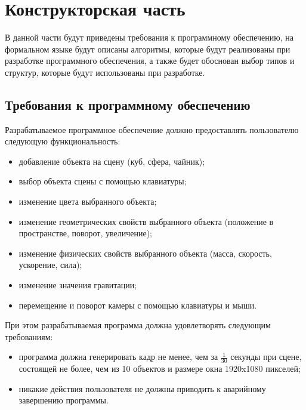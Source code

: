\section{Конструкторская часть}


В данной части будут приведены требования к программному обеспечению, на формальном языке будут описаны алгоритмы, которые будут реализованы при разработке программного обеспечения, а также будет обоснован выбор типов и структур, которые будут использованы при разработке. %

\subsection{Требования к программному обеспечению}


Разрабатываемое программное обеспечение должно предоставлять пользователю следующую функциональность:
\begin{itemize}
    \item добавление объекта на сцену (куб, сфера, чайник);
    \item выбор объекта сцены с помощью клавиатуры;
    \item изменение цвета выбранного объекта;
    \item изменение геометрических свойств выбранного объекта (положение в пространстве, поворот, увеличение);
    \item изменение физических свойств выбранного объекта (масса, скорость, ускорение, сила);
    \item изменение значения гравитации;
    \item перемещение и поворот камеры с помощью клавиатуры и мыши.
\end{itemize}

При этом разрабатываемая программа должна удовлетворять следующим требованиям:
\begin{itemize}
    \item программа должна генерировать кадр не менее, чем за $\frac{1}{30}$ секунды при сцене, состоящей не более, чем из 10 объектов и размере окна 1920x1080 пикселей;
    \item никакие действия пользователя не должны приводить к аварийному завершению программы.
\end{itemize}

